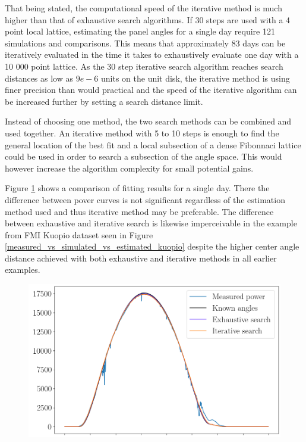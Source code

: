That being stated, the computational speed of the iterative method is much higher than that of exhaustive search algorithms. If 30 steps are used with a 4 point local lattice, estimating the panel angles for a single day require 121 simulations and comparisons. This means that approximately 83 days can be iteratively evaluated in the time it takes to exhaustively evaluate one day with a 10 000 point lattice. As the 30 step iterative search algorithm reaches search distances as low as $9e-6$ units on the unit disk, the iterative method is using finer precision than would practical and the speed of the iterative algorithm can be increased further by setting a search distance limit.

Instead of choosing one method, the two search methods can be combined and used together. An iterative method with 5 to 10 steps is enough to find the general location of the best fit and a local subsection of a dense Fibonnaci lattice could be used in order to search a subsection of the angle space. This would however increase the algorithm complexity for small potential gains.

Figure \ref{measured_vs_simulated_vs_estimated} shows a comparison of fitting results for a single day. There the difference between pover curves is not significant regardless of the estimation method used and thus iterative method may be preferable. The difference between exhaustive and iterative search is likewise imperceivable in the example from FMI Kuopio dataset seen in Figure \ref{measured_vs_simulated_vs_estimated_kuopio} despite the higher center angle distance achieved with both exhaustive and iterative methods in all earlier examples.


\begin{figure}[!h]
\centering
\includegraphics[width=0.8\linewidth]{pics/measured_vs_simulated_vs_estimated}
\label{measured_vs_simulated_vs_estimated}
\end{figure}

